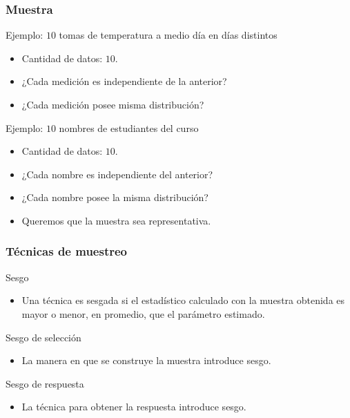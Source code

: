 \documentclass[table]{beamer}
\begin{document}
\begin{frame}
    \frametitle{Muestra}
    \begin{block}{Ejemplo: $10$ tomas de temperatura a medio día en días distintos}
        \begin{itemize}
            \item Cantidad de datos: $10$.
            \item ¿Cada medición es independiente de la anterior?
            \item ¿Cada medición posee misma distribución?
        \end{itemize}
    \end{block}
    \begin{block}{Ejemplo: $10$ nombres de estudiantes del curso}
        \begin{itemize}
            \item Cantidad de datos: $10$.
            \item ¿Cada nombre es independiente del anterior?
            \item ¿Cada nombre posee la misma distribución?
        \end{itemize}
    \end{block}
    \begin{block}{}
        \begin{itemize}
            \item Queremos que la muestra sea representativa.
        \end{itemize}
    \end{block}
\end{frame}

\begin{frame}
    \frametitle{Técnicas de muestreo}
    \begin{block}{Sesgo}
        \begin{itemize}
            \item Una técnica es sesgada si el estadístico calculado con la muestra obtenida es mayor o menor, en promedio, que el parámetro estimado.
        \end{itemize}
    \end{block}
    \begin{block}{Sesgo de selección}
        \begin{itemize}
            \item La manera en que se construye la muestra introduce sesgo.
        \end{itemize}
    \end{block}
    \begin{block}{Sesgo de respuesta}
        \begin{itemize}
            \item La técnica para obtener la respuesta introduce sesgo.
        \end{itemize}
    \end{block}
\end{frame}
\end{document}
